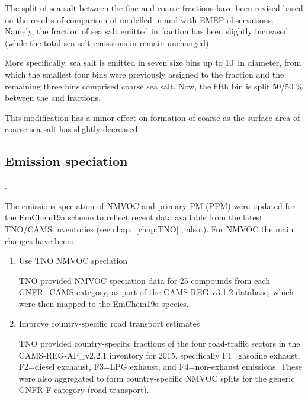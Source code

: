 The split of sea salt between the fine and coarse fractions have been revised based on the results of comparison of modelled  in \PM[2.5] and \PM[10] with EMEP observations. Namely, the fraction of sea salt emitted in \PM[2.5] fraction has been slightly increased (while the total sea salt emissions in \PM[10] remain unchanged). 

More specifically, sea salt is emitted in seven size bins up to 10~\um in diameter, from which the smallest four bins were previously assigned to the \PM[2.5] fraction and the remaining three bins comprised coarse sea salt. Now, the fifth bin is split 50/50 \% between the \PM[2.5] and \PM[2.5-10] fractions.  


This modification has a minor effect on formation of coarse  as the surface area of coarse sea salt has slightly decreased.



\subsection{Emission speciation}
\label{ssec:emissplits}.


The emissions speciation of NMVOC and primary PM (PPM) were updated
for the EmChem19a scheme to reflect recent data available from
the latest TNO/CAMS inventories (see chap.~\ref{chap:TNO} 
, also
\citealt{CAMSemis2019}).  For NMVOC the main changes have been:

\begin{enumerate}
  \item Use TNO NMVOC speciation

    TNO provided NMVOC speciation data for 25 compounds from each
    GNFR\_CAMS category, as part of the CAMS-REG-v3.1.2 database,
    which were then mapped to the EmChem19a species.

  \item Improve country-specific road transport estimates

    TNO provided country-specific fractions of the four road-traffic
    sectors in the CAMS-REG-AP\_v2.2.1 inventory for 2015, specifically
    F1=gasoline exhaust, F2=diesel exchaust, F3=LPG exhaust, and
    F4=non-exhaust emissions. These were also aggregated to form
    country-specific NMVOC splits for the generic GNFR F category
    (road transport).

\end{enumerate}

